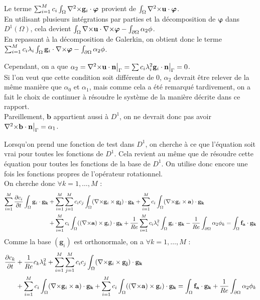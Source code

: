 Le terme $\sum_{i=1}^Mc_i\int_\Omega{\nabla^2\times}\mathbf{g}_i\cdot\bm{\varphi}$ provient de $\int_\Omega {\nabla^2\times}\mathbf{u}\cdot\bm{\varphi}$.\\
En utilisant plusieurs intégrations par parties et la décomposition de $\bm{\varphi}$ dans $D^1(\Omega)$, cela devient $\int_\Omega{\nabla\times}\mathbf{u}\cdot{\nabla\times}\bm{\varphi} -\int_{\partial\Omega} \alpha_2\phi$.\\
En repassant à la décomposition de Galerkin, on obtient donc le terme $\sum_{i=1}^Mc_i\lambda_i\int_\Omega\mathbf{g}_i\cdot{\nabla\times}\bm{\varphi}-\int_{\partial\Omega} \alpha_2\phi$.\\
\begin{rk}
  Cependant, on a que $\alpha_2={\nabla^2\times}\mathbf{u}\cdot\mathbf{n}{\big\rvert_{\Gamma}}=\sum c_i\lambda_i^2 \mathbf{g}_i\cdot\mathbf{n}{\big\rvert_{\Gamma}} = 0$.\\
Si l'on veut que cette condition soit différente de 0, $\alpha_2$ devrait être relever de la même manière que $\alpha_0$ et $\alpha_1$, mais comme cela a été remarqué tardivement, on a fait le choix de continuer à résoudre le système de la manière décrite dans ce rapport.\\
Pareillement, $\mathbf{b}$ appartient aussi à $D^1$, on ne devrait donc pas avoir ${\nabla^2\times}\mathbf{b}\cdot\mathbf{n}{\big\rvert_{\Gamma}}=\alpha_1$.
\end{rk}
Lorsqu'on prend une fonction de test dans $D^1$, on cherche à ce que l'équation soit vrai pour toutes les fonctions de $D^1$. Cela revient au même que de résoudre cette équation pour toutes les fonctions de la base de $D^1$. On utilise donc encore une fois les fonctions propres de l'opérateur rotationnel.\\
On cherche donc $\forall k=1,\dots,M$ :
\begin{align*}
\sum_{i=1}^M\frac{\partial c_i}{\partial t}\int_\Omega\mathbf{g}_i\cdot\mathbf{g_k} &+ \sum_{i=1}^M\sum_{j=1}^Mc_ic_j\int_\Omega({\nabla\times}\mathbf{g}_i\times \mathbf{g_j})\cdot\mathbf{g_k} + \sum_{i=1}^Mc_i\int_\Omega({\nabla\times}\mathbf{g}_i\times \mathbf{a})\cdot\mathbf{g_k}\\
& +  \sum_{i=1}^Mc_i\int_\Omega(({\nabla\times}\mathbf{a})\times \mathbf{g}_i)\cdot\mathbf{g_k} +\frac{1}{Re}\sum_{i=1}^Mc_i\lambda_i^2\int_\Omega\mathbf{g}_i\cdot\mathbf{g_k}-\frac{1}{Re}\int_{\partial\Omega} \alpha_2\phi_k = \int_\Omega\mathbf{f_a}\cdot\mathbf{g_k}\\
\end{align*}
Comme la base $(\mathbf{g}_i)$ est orthonormale, on a $\forall k=1,\dots,M$ :
\begin{align*}
\frac{\partial c_k}{\partial t} &+ \frac{1}{Re}c_k\lambda_k^2 + \sum_{i=1}^M\sum_{j=1}^Mc_ic_j\int_\Omega({\nabla\times}\mathbf{g}_i\times \mathbf{g_j})\cdot\mathbf{g_k}\\
& + \sum_{i=1}^Mc_i\int_\Omega({\nabla\times}\mathbf{g}_i\times \mathbf{a})\cdot\mathbf{g_k} +  \sum_{i=1}^Mc_i\int_\Omega(({\nabla\times}\mathbf{a})\times \mathbf{g}_i)\cdot\mathbf{g_k} = \int_\Omega\mathbf{f_a}\cdot\mathbf{g_k}+\frac{1}{Re}\int_{\partial\Omega} \alpha_2\phi_k\\
\end{align*}
